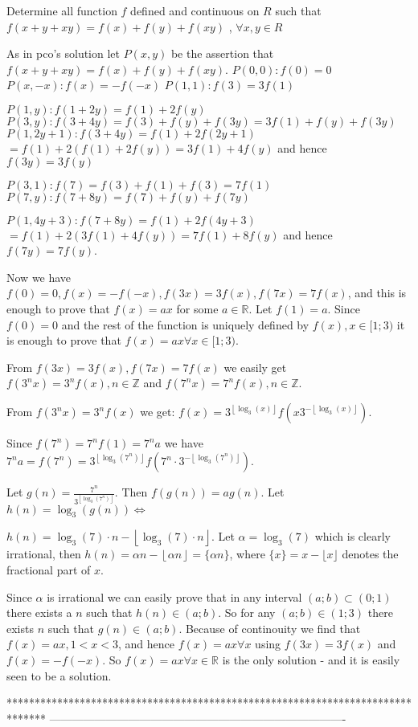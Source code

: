 \begin{solution}
	\begin{tcolorbox}Determine all function $ f$ defined and continuous on $ R$ such that
$ f(x + y + xy) = f(x) + f(y) + f(xy)$ , $ \forall x,y \in R$\end{tcolorbox}
As in pco's solution let $ P(x,y)$ be the assertion that $ f(x+y+xy)=f(x)+f(y)+f(xy)$.
$ P(0,0): f(0)=0$
$ P(x,-x): f(x) = -f(-x)$
$ P(1,1): f(3)=3f(1)$

$ P(1,y): f(1+2y) = f(1)+2f(y)$
$ P(3,y): f(3+4y) = f(3)+f(y)+f(3y) = 3f(1)+f(y)+f(3y)$
$ P(1,2y+1): f(3+4y) = f(1) + 2f(2y+1)$ $ = f(1) + 2(f(1)+2f(y)) = 3f(1)+4f(y)$ and hence $ f(3y)=3f(y)$

$ P(3,1): f(7) = f(3)+f(1)+f(3) = 7f(1)$
$ P(7,y): f(7+8y) = f(7) + f(y) + f(7y)$

$ P(1,4y+3): f(7+8y) = f(1) + 2f(4y+3)$ $ = f(1) + 2(3f(1)+4f(y)) = 7f(1)+8f(y)$ and hence $ f(7y) = 7f(y)$.

Now we have $ f(0)=0, f(x)=-f(-x), f(3x)=3f(x), f(7x) = 7f(x)$, and this is enough to prove that $ f(x) = ax$ for some $ a \in \mathbb{R}$. Let $ f(1)=a$. Since $ f(0)=0$ and the rest of the function is uniquely defined by $ f(x), x \in [1;3)$ it is enough to prove that $ f(x) = ax \forall x \in [1;3)$.

From $ f(3x)=3f(x), f(7x) = 7f(x)$ we easily get $ f(3^nx)=3^nf(x), n \in \mathbb{Z}$ and $ f(7^nx) = 7^nf(x), n \in \mathbb{Z}$.

From $ f(3^nx)=3^nf(x)$ we get: $ f(x) = 3^{\left \lfloor \log_3(x) \right \rfloor} f( x 3^{-\left \lfloor \log_3(x) \right \rfloor} )$.

Since $ f(7^n) = 7^n f(1) = 7^n a$ we have $ 7^n a = f(7^n) = 3^{\left \lfloor \log_3(7^n) \right \rfloor} f( 7^n \cdot 3^{-\left \lfloor \log_3(7^n) \right \rfloor} )$.

Let $ g(n) = \frac{7^n}{3^{\left \lfloor \log_3(7^n) \right \rfloor}}$. Then $ f(g(n)) = ag(n)$. Let $ h(n) = \log_3(g(n)) \iff$

$ h(n) = \log_3(7) \cdot n -\left \lfloor \log_3(7) \cdot n \right \rfloor$. Let $ \alpha = \log_3(7)$ which is clearly irrational, then $ h(n) = \alpha n - \left \lfloor \alpha n \right \rfloor = \{ \alpha n \}$, where $ \{x\} = x - \lfloor x \rfloor$ denotes the fractional part of $ x$.

Since $ \alpha$ is irrational we can easily prove that in any interval $ (a;b) \subset (0;1)$ there exists a $ n$ such that $ h(n) \in (a;b)$. So for any $ (a;b) \in (1;3)$ there exists $ n$ such that $ g(n) \in (a;b)$. Because of continouity we find that $ f(x) = ax, 1 < x < 3$, and hence $ f(x) = ax \forall x$ using $ f(3x)=3f(x)$ and $ f(x)=-f(-x)$. So $ f(x) = ax \forall x \in \mathbb{R}$ is the only solution - and it is easily seen to be a solution.
\end{solution}
*******************************************************************************
-------------------------------------------------------------------------------

